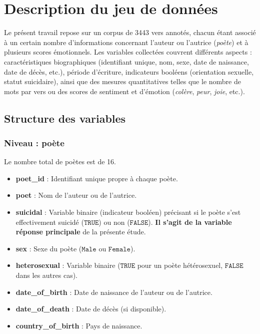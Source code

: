 \section{Description du jeu de données}
\label{sec:description-donnees}

Le présent travail repose sur un corpus de 3443 vers annotés, chacun étant associé à un certain nombre d’informations concernant l’auteur ou l’autrice (\emph{poète}) et à plusieurs scores émotionnels. Les variables collectées couvrent différents aspects : caractéristiques biographiques (identifiant unique, nom, sexe, date de naissance, date de décès, etc.), période d’écriture, indicateurs booléens (orientation sexuelle, statut suicidaire), ainsi que des mesures quantitatives telles que le nombre de mots par vers ou des scores de sentiment et d’émotion (\emph{colère}, \emph{peur}, \emph{joie}, etc.).

\subsection{Structure des variables}

\subsubsection{Niveau : poète}
Le nombre total de poètes est de 16.

\begin{itemize}
	\item \textbf{poet\_id} : Identifiant unique propre à chaque poète.
	\item \textbf{poet} : Nom de l’auteur ou de l’autrice.
	\item \textbf{suicidal} : Variable binaire (indicateur booléen) précisant si le poète s’est effectivement suicidé (\(\texttt{TRUE}\)) ou non (\(\texttt{FALSE}\)). \textbf{Il s’agit de la variable réponse principale} de la présente étude.
	\item \textbf{sex}  : Sexe du poète (\(\texttt{Male}\) ou \(\texttt{Female}\)).
	\item \textbf{heterosexual} : Variable binaire (\(\texttt{TRUE}\) pour un poète hétérosexuel, \(\texttt{FALSE}\) dans les autres cas).
	\item \textbf{date\_of\_birth} : Date de naissance de l’auteur ou de l’autrice.
	\item \textbf{date\_of\_death} : Date de décès (si disponible).
	\item \textbf{country\_of\_birth} : Pays de naissance.
\end{itemize}
	
